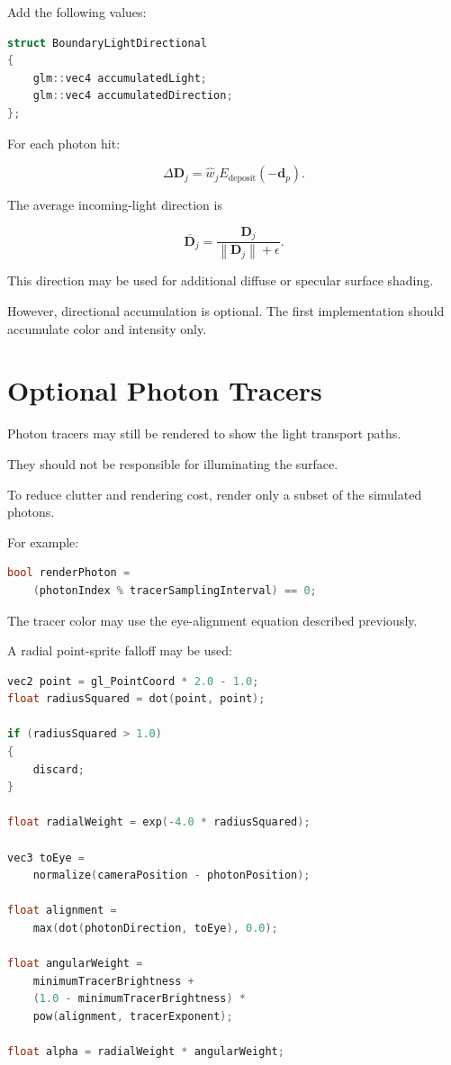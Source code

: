 \documentclass[11pt]{article}
\begin{document}
Add the following values:

\begin{lstlisting}[language=C++]
struct BoundaryLightDirectional
{
    glm::vec4 accumulatedLight;
    glm::vec4 accumulatedDirection;
};
\end{lstlisting}

For each photon hit:

\begin{equation}
    \Delta \mathbf{D}_{j}
    =
    \widehat{w}_{j}
    E_{\mathrm{deposit}}
    \left(
        -\mathbf{d}_{p}
    \right).
\end{equation}

The average incoming-light direction is

\begin{equation}
    \overline{\mathbf{D}}_{j}
    =
    \frac{\mathbf{D}_{j}}
    {\left\|\mathbf{D}_{j}\right\|+\epsilon}.
\end{equation}

This direction may be used for additional diffuse or specular surface shading.

However, directional accumulation is optional. The first implementation should
accumulate color and intensity only.

\section{Optional Photon Tracers}

Photon tracers may still be rendered to show the light transport paths.

They should not be responsible for illuminating the surface.

To reduce clutter and rendering cost, render only a subset of the simulated
photons.

For example:

\begin{lstlisting}[language=C++]
bool renderPhoton =
    (photonIndex % tracerSamplingInterval) == 0;
\end{lstlisting}

The tracer color may use the eye-alignment equation described previously.

A radial point-sprite falloff may be used:

\begin{lstlisting}[language=C++]
vec2 point = gl_PointCoord * 2.0 - 1.0;
float radiusSquared = dot(point, point);

if (radiusSquared > 1.0)
{
    discard;
}

float radialWeight = exp(-4.0 * radiusSquared);

vec3 toEye =
    normalize(cameraPosition - photonPosition);

float alignment =
    max(dot(photonDirection, toEye), 0.0);

float angularWeight =
    minimumTracerBrightness +
    (1.0 - minimumTracerBrightness) *
    pow(alignment, tracerExponent);

float alpha = radialWeight * angularWeight;
\end{lstlisting}
\end{document}
